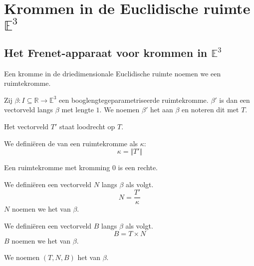 \documentclass[main.tex]{subfiles}
\begin{document}
\chapter{Krommen in de Euclidische ruimte$\mathbb{E}^{3}$}
\label{cha:kromm-het-eucl}

\section{Het Frenet-apparaat voor krommen in $\mathbb{E}^{3}$}
\label{sec:het-frenet-apparaat-voor-krommen-in-e3}


\begin{de}
  Een kromme in de driedimensionale Euclidische ruimte noemen we een ruimtekromme.
\end{de}

\begin{de}
  Zij $\beta: I \subseteq \mathbb{R} \rightarrow \mathbb{E}^{3}$ een booglengtegeparametriseerde ruimtekromme.
  $\beta'$ is dan een vectorveld langs $\beta$ met lengte $1$.
  We noemen $\beta'$ het  aan $\beta$ en noteren dit met $T$.
\end{de}

\begin{st}
  Het vectorveld $T'$ staat loodrecht op $T$.
\end{st}

\begin{de}
  We defini\"eren de  van een ruimtekromme als $\kappa$:
  \[ \kappa = \Vert T' \Vert \]
\end{de}

\begin{st}
  Een ruimtekromme met kromming $0$ is een rechte.
\end{st}

\begin{de}
  We defini\"eren een vectorveld $N$ langs $\beta$ als volgt.
  \[ N = \frac{T'}{\kappa} \]
  $N$ noemen we het  van $\beta$.
\end{de}

\begin{de}
  We defini\"eren een vectorveld $B$ langs $\beta$ als volgt.
  \[ B = T \times N \]
  $B$ noemen we het  van $\beta$.
\end{de}

\begin{de}
  We noemen $(T,N,B)$ het  van $\beta$.
\end{de}
\end{document}

